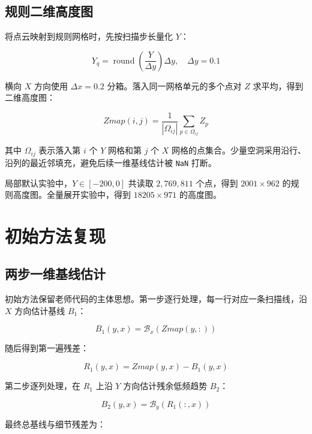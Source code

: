 \documentclass[12pt,hyperref,a4paper,UTF8,fontset=fandol]{ctexart}
\begin{document}
\subsection{规则二维高度图}

将点云映射到规则网格时，先按扫描步长量化 $Y$：

\begin{equation}
Y_q = \operatorname{round}\left(\frac{Y}{\Delta y}\right)\Delta y ,
\quad \Delta y = 0.1
\end{equation}

横向 $X$ 方向使用 $\Delta x=0.2$ 分箱。落入同一网格单元的多个点对 $Z$ 求平均，得到二维高度图：

\begin{equation}
Zmap(i,j)=\frac{1}{|\Omega_{ij}|}\sum_{p\in\Omega_{ij}}Z_p
\end{equation}

其中 $\Omega_{ij}$ 表示落入第 $i$ 个 $Y$ 网格和第 $j$ 个 $X$ 网格的点集合。少量空洞采用沿行、沿列的最近邻填充，避免后续一维基线估计被 \texttt{NaN} 打断。

局部默认实验中，$Y\in[-200,0]$ 共读取 $2,769,811$ 个点，得到 $2001\times 962$ 的规则高度图。全量展开实验中，得到 $18205\times 971$ 的高度图。

\section{初始方法复现}

\subsection{两步一维基线估计}

初始方法保留老师代码的主体思想。第一步逐行处理，每一行对应一条扫描线，沿 $X$ 方向估计基线 $B_1$：

\begin{equation}
B_1(y,x)=\mathcal{B}_x(Zmap(y,:))
\end{equation}

随后得到第一遍残差：

\begin{equation}
R_1(y,x)=Zmap(y,x)-B_1(y,x)
\end{equation}

第二步逐列处理，在 $R_1$ 上沿 $Y$ 方向估计残余低频趋势 $B_2$：

\begin{equation}
B_2(y,x)=\mathcal{B}_y(R_1(:,x))
\end{equation}

最终总基线与细节残差为：
\end{document}
